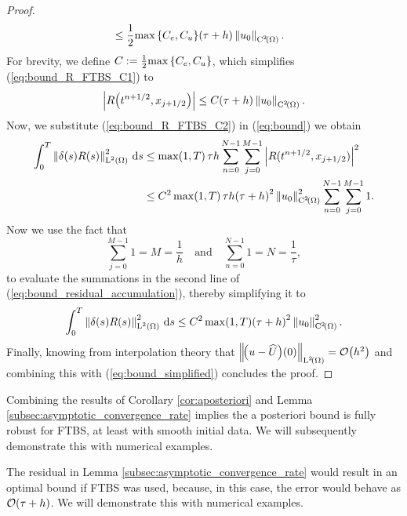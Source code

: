 \documentclass[final]{amsart}
\renewcommand{\d}{\ensuremath{\,\mathrm{d}}}
\numberwithin{equation}{section}
\begin{document}
\begin{proof}
\begin{equation}
\begin{aligned}
	&\leq 
	\frac{1}{2}
	{\max\left\lbrace C_e,C_u\right\rbrace}\!\left({\tau+h}\right)
	\left\|u_0\right\|_{\operatorname C^{2}\!\left({\Omega}\right)}.
	\end{aligned}
	\end{equation}
	For brevity, we define $C:=\frac{1}{2}{\max\left\lbrace C_e,C_u\right\rbrace}$,
	which simplifies (\ref{eq:bound_R_FTBS_C1}) to 
	\begin{equation}\label{eq:bound_R_FTBS_C2}
	\left|R\!\left({t^{n+1/2},x_{j+1/2}}\right)\right|
	\leq
	C\!\left({\tau+h}\right) \left\|u_0\right\|_{\operatorname C^{2}\!\left({\Omega}\right)}.
	\end{equation}
	Now, we substitute (\ref{eq:bound_R_FTBS_C2})  in (\ref{eq:bound}) we obtain
	\begin{equation}\label{eq:bound_residual_accumulation}
	\begin{aligned}
	\int_0^T \Norm{\delta(s) R(s)}_{\leb{2}(\W)}^2 \d s
	&\leq
	\max\qp{1,{T}}\tau h \sum_{n=0}^{N-1}
	\sum_{j=0}^{M-1} \norm{R(t^{n+1/2}, x_{j+1/2})}^2\\
	&\leq
	C^2\max\qp{1,{T}}\tau h 
	\qp{\tau+h}^2\Norm{u_0}_{\cont{2}\qp{\W}}^2
	\sum_{n=0}^{N-1}
	\sum_{j=0}^{M-1} 1.
	\end{aligned}
	\end{equation}
	Now we use the fact that
	\begin{equation}
	\sum_{j=0}^{M-1}1=M=\frac{1}{h}\quad \text{and}\quad \sum_{n=0}^{N-1}1=N=\frac{1}{\tau},
	\end{equation}
	to evaluate the summations in the second line of (\ref{eq:bound_residual_accumulation}), thereby simplifying it to
	\begin{equation}\label{eq:bound_simplified}
	\int_0^T \Norm{\delta(s) R(s)}_{\leb{2}(\W)}^2 \d s
	\leq
	C^2\max\qp{1,{T}}
	\qp{\tau+h}^2\Norm{u_0}_{\cont{2}\qp{\W}}^2.
	\end{equation}	
	Finally, knowing from interpolation theory that $\left\|\!\left({u-\widehat{U}}\right)\!\left({0}\right)\right\|_{\operatorname L^{2}\!\left({\Omega}\right)}=\mathcal{O}\!\left({h^2}\right)$ and combining this with (\ref{eq:bound_simplified}) concludes the proof.  
\end{proof}
\begin{Rem} Combining the results of Corollary \ref{cor:aposteriori}
	and Lemma \ref{subsec:asymptotic_convergence_rate} implies the a
	posteriori bound is fully robust for FTBS, at least with smooth
	initial data. We will subsequently demonstrate this with numerical
	examples.
\end{Rem}
\begin{Rem}
The residual in Lemma \ref{subsec:asymptotic_convergence_rate} would result in an optimal bound if FTBS was used, because, in this case, the error  would behave as $\mathcal{O}\!\left({\tau+h}\right)$.  We will demonstrate this with numerical examples.
\end{Rem}
\end{document}
